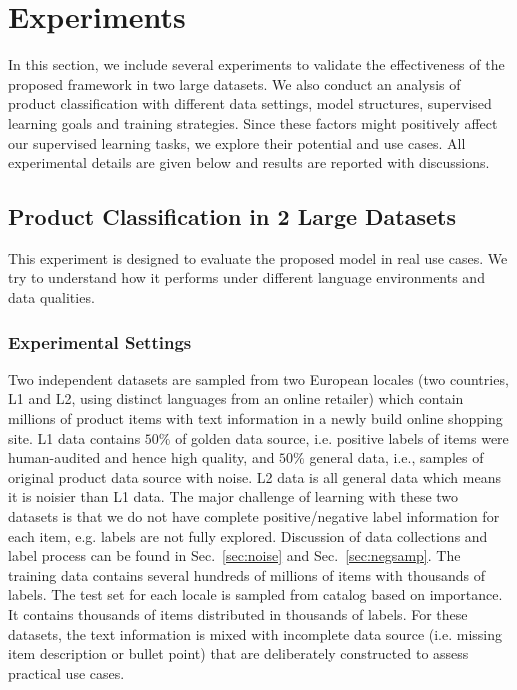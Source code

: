 \documentclass[11pt,dvipsnames]{article}
\begin{document}
 

\section{Experiments}
In this section, we include several experiments to validate the effectiveness of the proposed framework in two large datasets. We also conduct an analysis of product classification with different data settings, model structures, supervised learning goals and training strategies. Since these factors might positively affect our supervised learning tasks, we explore their potential and use cases. All experimental details are given below and results are reported with discussions.

\subsection{Product Classification in 2 Large Datasets}
This experiment is designed to evaluate the proposed model in real use cases. We try to understand how it performs under different language environments and data qualities.  

\subsubsection{Experimental Settings}
 Two independent datasets are sampled from two European locales (two countries, L1 and L2, using distinct languages from an online retailer) which contain millions of product items with text information in a newly build online shopping site. L1 data contains $50\%$ of golden data source, i.e. positive labels of items were human-audited and hence high quality, and $50\%$ general data, i.e., samples of original product data source with noise. L2 data is all general data which means it is noisier than L1 data. The major challenge of learning with these two datasets is that we do not have complete positive/negative label information for each item, e.g. labels are not fully explored. Discussion of data collections and label process can be found in Sec.~\ref{sec:noise} and Sec.~\ref{sec:negsamp}. The training data contains several hundreds of millions of items with thousands of labels. The test set for each locale is sampled from catalog based on importance. It contains thousands of items distributed in thousands of labels. For these datasets, the text information is mixed with incomplete data source (i.e. missing item description or bullet point) that are deliberately constructed to assess practical use cases. 
 
\end{document}
